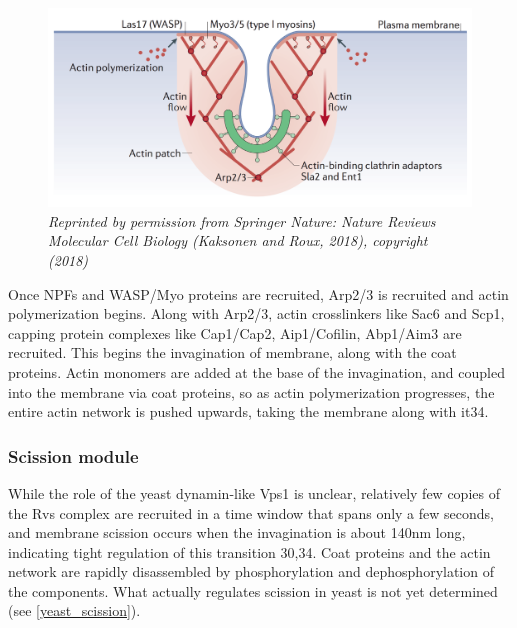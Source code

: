 	\begin{figure}[H]
	\centering
	\includegraphics[scale=0.4]{figures/intro/actin_kaksonen}
	\caption[Actin network in endocytosis]
	{	\textit{Reprinted by permission from Springer Nature: Nature Reviews Molecular Cell Biology (Kaksonen and Roux, 2018), copyright (2018)
	}}
\end{figure}

			\vspace{5mm}
			Once NPFs and WASP/Myo proteins are recruited, Arp2/3 is recruited and actin polymerization begins. Along with Arp2/3, actin crosslinkers like Sac6 and Scp1, capping protein complexes like Cap1/Cap2, Aip1/Cofilin, Abp1/Aim3 are recruited. This begins the invagination of membrane, along with the coat proteins. Actin monomers are added at the base of the invagination, and coupled into the membrane via coat proteins, so as actin polymerization progresses, the entire actin network is pushed upwards, taking the membrane along with it34.
			


			\subsubsection{Scission module}
		While the role of the yeast dynamin-like Vps1 is unclear, relatively few copies of the Rvs complex are recruited in a time window that spans only a few seconds, and membrane scission occurs when the invagination is about 140nm long, indicating tight regulation of this transition 30,34. Coat proteins and the actin network are rapidly disassembled by phosphorylation and dephosphorylation of the components.  What actually regulates scission in yeast is not yet determined (see \ref{yeast_scission}).


